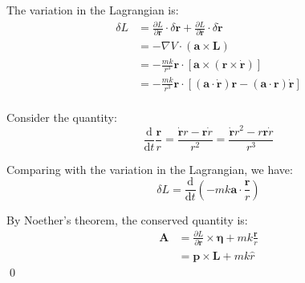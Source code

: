 \documentclass[12pt]{article}
\begin{document}
The variation in the Lagrangian is:
\begin{equation}
    \begin{split}
        \delta L &= \frac{\partial L}{\partial \mathbf{r}} \cdot \delta \mathbf{r} + \frac{\partial L}{\partial \dot{\mathbf{r}}} \cdot \delta \dot{\mathbf{r}} \\
        &= -\nabla V \cdot (\mathbf{a} \times \mathbf{L}) \\
        &= -\frac{mk}{r^{3}} \mathbf{r} \cdot \left[ \mathbf{a} \times (\mathbf{r} \times \dot{\mathbf{r}}) \right] \\
        &= -\frac{mk}{r^{3}} \mathbf{r} \cdot \left[ (\mathbf{a} \cdot \dot{\mathbf{r}}) \mathbf{r} - (\mathbf{a} \cdot \mathbf{r}) \dot{\mathbf{r}} \right] \\
    \end{split}
\end{equation}

Consider the quantity:
\begin{equation}
    \frac{\mathrm{d}}{\mathrm{d}t} \frac{\mathbf{r}}{r} = \frac{\dot{\mathbf{r}} r - \mathbf{r} \dot{r}}{r^{2}} = \frac{\dot{\mathbf{r}} r^{2} - r\mathbf{r} \dot{r}}{r^{3}}
\end{equation}

Comparing with the variation in the Lagrangian, we have:
\begin{equation}
    \delta L = \frac{\mathrm{d}}{\mathrm{d}t} \left( -mk \mathbf{a} \cdot \frac{\mathbf{r}}{r} \right)
\end{equation}

By Noether's theorem, the conserved quantity is:
\begin{equation}
    \begin{split}
        \mathbf{A} &= \frac{\partial L}{\partial \dot{\mathbf{r}}} \times \mathbf{\eta} + mk \frac{\mathbf{r}}{r} \\
        &= \mathbf{p} \times \mathbf{L} + mk \hat{r}
    \end{split}
\end{equation}
\qed

\end{document}

